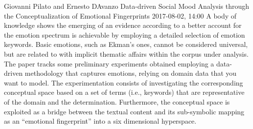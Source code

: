 \documentclass[10pt,fleqn,openany]{book} %
\begin{document}
\begin{enumerate}
		
		\paperabstract
		{Giovanni Pilato and Ernesto DAvanzo}
		{Data-driven Social Mood Analysis through the Conceptualization of Emotional Fingerprints}
		{2017-08-02, 14:00}
		{A body of knowledge shows the emerging of an evidence according to a better account for the emotion spectrum is achievable by employing a detailed selection of emotion keywords. Basic emotions, such as Ekman's ones, cannot be considered universal, but are related to with implicit thematic affairs within the corpus under analysis. The paper tracks some preliminary experiments obtained employing a data-driven methodology that captures emotions, relying on domain data that you want to model. The experimentation consists of investigating the corresponding conceptual space based on a set of terms (i.e., keywords) that are representative of the domain and the determination. Furthermore, the conceptual space is exploited as a bridge between the textual content and its sub-symbolic mapping as an ``emotional fingerprint'' into a six dimensional hyperspace.}
		

\end{enumerate}
\end{document}
